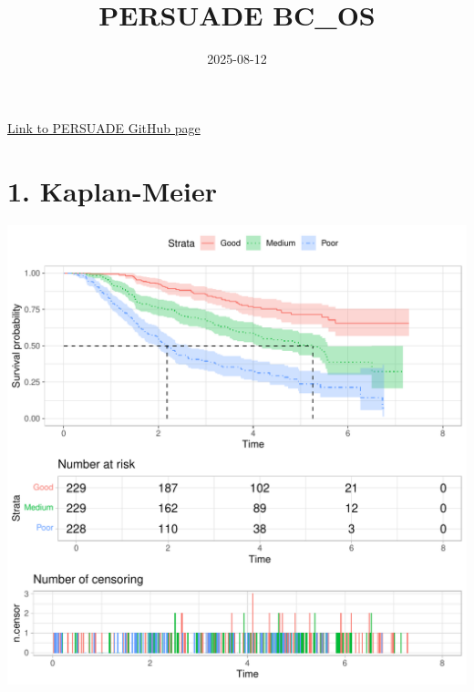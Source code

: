 \documentclass[
]{article}
\title{PERSUADE BC\_OS}
\author{}
\date{\vspace{-2.5em}2025-08-12}
\begin{document}
\maketitle

{
\hypersetup{linkcolor=}
\setcounter{tocdepth}{2}
\tableofcontents
}
\hfill\break

\href{https://github.com/Bram-R/PERSUADE}{Link to PERSUADE GitHub page}

\clearpage

\section{1. Kaplan-Meier}\label{kaplan-meier}

\begin{flushleft}\includegraphics{BC_OS_output/Images/Figure_plot_KM-1} \end{flushleft}
\end{document}
